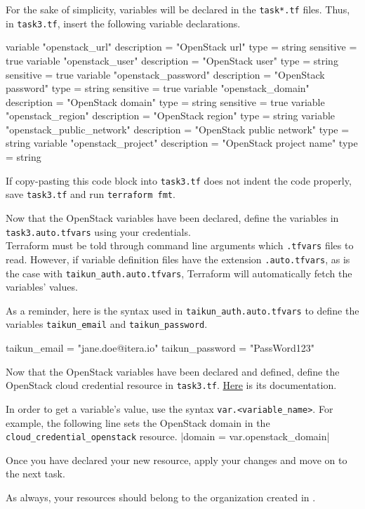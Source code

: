 For the sake of simplicity, variables will be declared in the \texttt{task*.tf} files.
Thus, in \texttt{task3.tf}, insert the following variable declarations.
\begin{tf}
variable "openstack_url" {
  description = "OpenStack url"
  type        = string
  sensitive   = true
}
variable "openstack_user" {
  description = "OpenStack user"
  type        = string
  sensitive   = true
}
variable "openstack_password" {
  description = "OpenStack password"
  type        = string
  sensitive   = true
}
variable "openstack_domain" {
  description = "OpenStack domain"
  type        = string
  sensitive   = true
}
variable "openstack_region" {
  description = "OpenStack region"
  type        = string
}
variable "openstack_public_network" {
  description = "OpenStack public network"
  type        = string
}
variable "openstack_project" {
  description = "OpenStack project name"
  type        = string
}
\end{tf}
\begin{note}
  If copy-pasting this code block into \texttt{task3.tf} does not indent the code properly,
  save \texttt{task3.tf} and run \texttt{terraform fmt}.
\end{note}

Now that the OpenStack variables have been declared,
define the variables in \texttt{task3.auto.tfvars} using your credentials.\\

Terraform must be told through command line arguments which \texttt{.tfvars} files to read.
However, if variable definition files have the extension \texttt{.auto.tfvars}, as is the case with
\texttt{taikun\_auth.auto.tfvars}, Terraform will automatically fetch the variables' values.
\begin{tip}
As a reminder, here is the syntax used in \texttt{taikun\_auth.auto.tfvars} to define the variables \texttt{taikun\_email}
and \texttt{taikun\_password}.
\begin{tf}
taikun_email = "jane.doe@itera.io"
taikun_password = "PassWord123"
\end{tf}
\end{tip}

Now that the OpenStack variables have been declared and defined, define the OpenStack cloud credential resource in \texttt{task3.tf}.
\href{https://registry.terraform.io/providers/itera-io/taikun/latest/docs/resources/cloud_credential_openstack}{Here} is its documentation.

\begin{tip}
In order to get a variable's value, use the syntax \texttt{var.<variable\_name>}.
For example, the following line sets the OpenStack domain in the \texttt{cloud\_credential\_openstack} resource.
|domain = var.openstack_domain|
\end{tip}

Once you have declared your new resource, apply your changes and move on to the next task.

\begin{warn}
As always, your resources should belong to the organization created in
.
\end{warn}

